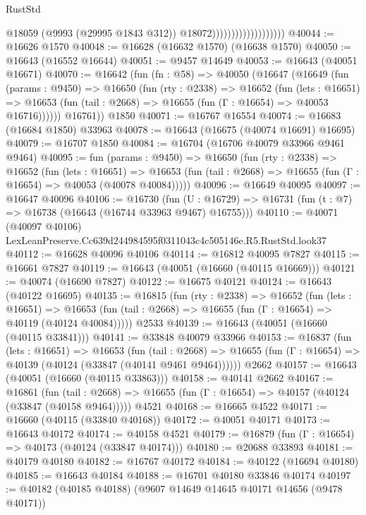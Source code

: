 \begin{lexlean}{RustStd}
\begin{coremodule}
                                          @18059
                                          (@9993 (@29995 @1843 @312))
                                          @18072)))))))))))))))))))
@40044 := @16626 @1570
@40048 := @16628 (@16632 @1570) (@16638 @1570)
@40050 := @16643 (@16552 @16644)
@40051 := @9457 @14649
@40053 := @16643 (@40051 @16671)
@40070 := @16642
    (fun (fn : @58) =>
    @40050
      (@16647
        (@16649
          (fun (params : @9450) =>
          @16650
            (fun (rty : @2338) =>
            @16652
              (fun (lets : @16651) =>
              @16653 (fun (tail : @2668) => @16655 (fun (Γ : @16654) => @40053 @16716))))))
        @16761))
    @1850
@40071 := @16767 @16554
@40074 := @16683 (@16684 @1850) @33963
@40078 := @16643 (@16675 (@40074 @16691) @16695)
@40079 := @16707 @1850
@40084 := @16704 (@16706 @40079 @33966 @9461 @9464)
@40095 := fun (params : @9450) =>
  @16650
    (fun (rty : @2338) =>
    @16652
      (fun (lets : @16651) =>
      @16653 (fun (tail : @2668) => @16655 (fun (Γ : @16654) => @40053 (@40078 @40084)))))
@40096 := @16649 @40095
@40097 := @16647 @40096
@40106 := @16730
    (fun (U : @16729) => @16731 (fun (t : @7) => @16738 (@16643 (@16744 @33963 @9467) @16755)))
@40110 := @40071 (@40097 @40106) LexLeanPreserve.Cc639d244984595f0311043c4c505146e.R5.RustStd.look37
@40112 := @16628 @40096 @40106
@40114 := @16812 @40095 @7827
@40115 := @16661 @7827
@40119 := @16643 (@40051 (@16660 (@40115 @16669)))
@40121 := @40074 (@16690 @7827)
@40122 := @16675 @40121
@40124 := @16643 (@40122 @16695)
@40135 := @16815
    (fun (rty : @2338) =>
    @16652
      (fun (lets : @16651) =>
      @16653 (fun (tail : @2668) => @16655 (fun (Γ : @16654) => @40119 (@40124 @40084)))))
    @2533
@40139 := @16643 (@40051 (@16660 (@40115 @33841)))
@40141 := @33848 @40079 @33966
@40153 := @16837
    (fun (lets : @16651) =>
    @16653
      (fun (tail : @2668) =>
      @16655 (fun (Γ : @16654) => @40139 (@40124 (@33847 (@40141 @9461 @9464))))))
    @2662
@40157 := @16643 (@40051 (@16660 (@40115 @33863)))
@40158 := @40141 @2662
@40167 := @16861
    (fun (tail : @2668) => @16655 (fun (Γ : @16654) => @40157 (@40124 (@33847 (@40158 @9464)))))
    @4521
@40168 := @16665 @4522
@40171 := @16660 (@40115 (@33840 @40168))
@40172 := @40051 @40171
@40173 := @16643 @40172
@40174 := @40158 @4521
@40179 := @16879 (fun (Γ : @16654) => @40173 (@40124 (@33847 @40174)))
@40180 := @20688 @33893
@40181 := @40179 @40180
@40182 := @16767 @40172
@40184 := @40122 (@16694 @40180)
@40185 := @16643 @40184
@40188 := @16701 @40180 @33846 @40174
@40197 := @40182 (@40185 @40188) (@9607 @14649 @14645 @40171 @14656 (@9478 @40171))

\end{coremodule}
\end{lexlean}

